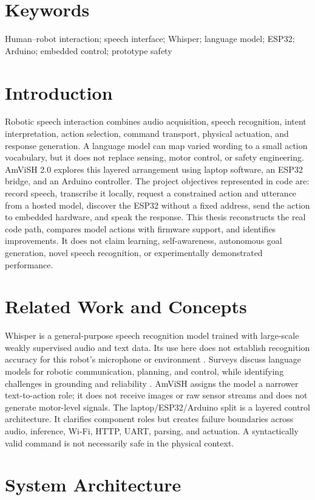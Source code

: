 \documentclass[12pt,a4paper]{report}
\begin{document}
\chapter*{Keywords}
Human--robot interaction; speech interface; Whisper; language model; ESP32; Arduino; embedded control; prototype safety
\tableofcontents\listoftables\clearpage{}
\chapter{Introduction}
Robotic speech interaction combines audio acquisition, speech recognition, intent interpretation, action selection, command transport, physical actuation, and response generation. A language model can map varied wording to a small action vocabulary, but it does not replace sensing, motor control, or safety engineering. AmViSH 2.0 explores this layered arrangement using laptop software, an ESP32 bridge, and an Arduino controller.
The project objectives represented in code are: record speech, transcribe it locally, request a constrained action and utterance from a hosted model, discover the ESP32 without a fixed address, send the action to embedded hardware, and speak the response. This thesis reconstructs the real code path, compares model actions with firmware support, and identifies improvements. It does not claim learning, self-awareness, autonomous goal generation, novel speech recognition, or experimentally demonstrated performance.
\chapter{Related Work and Concepts}
Whisper is a general-purpose speech recognition model trained with large-scale weakly supervised audio and text data. Its use here does not establish recognition accuracy for this robot's microphone or environment \cite{radford}. Surveys discuss language models for robotic communication, planning, and control, while identifying challenges in grounding and reliability \cite{kim,ma}. AmViSH assigns the model a narrower text-to-action role; it does not receive images or raw sensor streams and does not generate motor-level signals.
The laptop/ESP32/Arduino split is a layered control architecture. It clarifies component roles but creates failure boundaries across audio, inference, Wi-Fi, HTTP, UART, parsing, and actuation. A syntactically valid command is not necessarily safe in the physical context.
\chapter{System Architecture}
\end{document}
